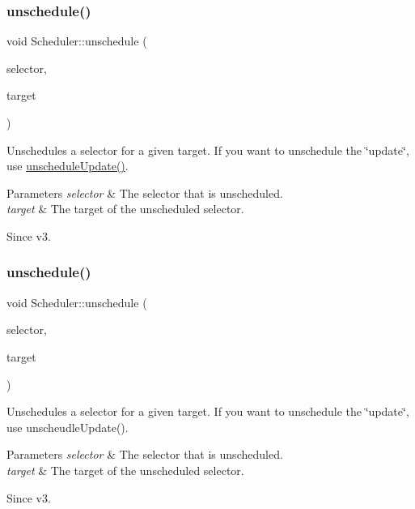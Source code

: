 \subsubsection{\texorpdfstring{unschedule()}{unschedule()}\hspace{0.1cm}{\footnotesize\ttfamily [3/4]}}
{\footnotesize\ttfamily void Scheduler\+::unschedule (\begin{DoxyParamCaption}\item[{S\+E\+L\+\_\+\+S\+C\+H\+E\+D\+U\+LE}]{selector,  }\item[{\hyperlink{classRef}{Ref} $\ast$}]{target }\end{DoxyParamCaption})}

Unschedules a selector for a given target. If you want to unschedule the \char`\"{}update\char`\"{}, use {\ttfamily \hyperlink{classScheduler_acc7bc87cc441a0f826c2a6758a9adcad}{unschedule\+Update()}}. 
\begin{DoxyParams}{Parameters}
{\em selector} & The selector that is unscheduled. \\
\hline
{\em target} & The target of the unscheduled selector. \\
\hline
\end{DoxyParams}
\begin{DoxySince}{Since}
v3. 
\end{DoxySince}
\mbox{\label{classScheduler_a6d354b587d5f12df2e6094116fd65c71}} 
\subsubsection{\texorpdfstring{unschedule()}{unschedule()}\hspace{0.1cm}{\footnotesize\ttfamily [4/4]}}
{\footnotesize\ttfamily void Scheduler\+::unschedule (\begin{DoxyParamCaption}\item[{S\+E\+L\+\_\+\+S\+C\+H\+E\+D\+U\+LE}]{selector,  }\item[{\hyperlink{classRef}{Ref} $\ast$}]{target }\end{DoxyParamCaption})}

Unschedules a selector for a given target. If you want to unschedule the \char`\"{}update\char`\"{}, use {\ttfamily unscheudle\+Update()}. 
\begin{DoxyParams}{Parameters}
{\em selector} & The selector that is unscheduled. \\
\hline
{\em target} & The target of the unscheduled selector. \\
\hline
\end{DoxyParams}
\begin{DoxySince}{Since}
v3. 
\end{DoxySince}
\mbox{\label{classScheduler_a0746c417a3cf7c794d1ee32969994e6a}} 
